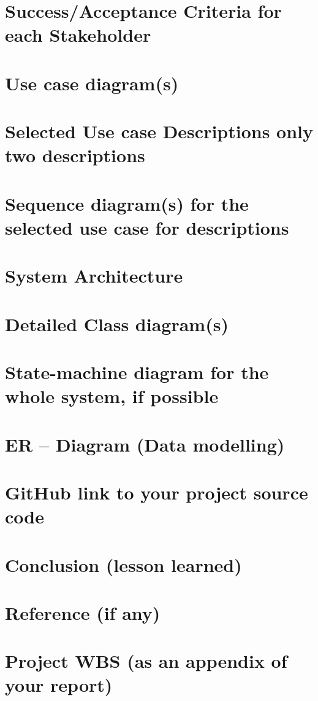 \documentclass[11pt]{article}
\begin{document}
    \chapter{Success/Acceptance Criteria for each Stakeholder}


    \chapter{Use case diagram(s)}


    \chapter{Selected Use case Descriptions {only two descriptions}}


    \chapter{Sequence diagram(s) {for the selected use case for descriptions}}


    \chapter{System Architecture}


    \chapter{Detailed Class diagram(s)}


    \chapter{State-machine diagram {for the whole system, if possible}}


    \chapter{ER – Diagram (Data modelling)}


    \chapter{GitHub link to your project source code}


    \chapter{Conclusion (lesson learned)}


    \chapter{Reference (if any)}


    \chapter{Project WBS (as an appendix of your report)}





    
    
\end{document}
